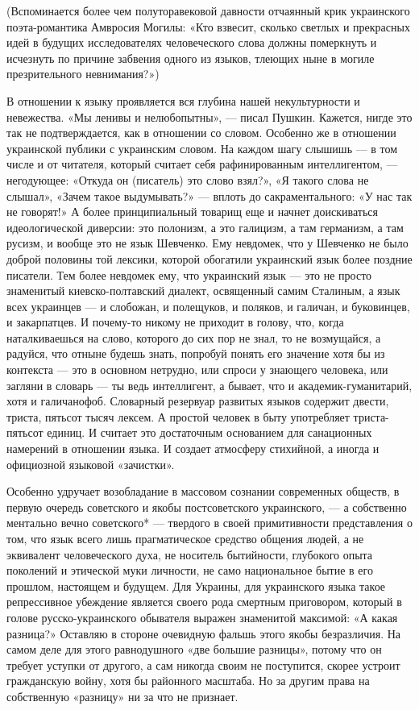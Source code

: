 (Вспоминается более чем полуторавековой давности отчаянный крик украинского
поэта-романтика Амвросия Могилы: «Кто взвесит, сколько светлых и прекрасных
идей в будущих исследователях человеческого слова должны померкнуть и исчезнуть
по причине забвения одного из языков, тлеющих ныне в могиле презрительного
невнимания?»)

В отношении к языку проявляется вся глубина нашей некультурности и невежества.
«Мы ленивы и нелюбопытны», — писал Пушкин. Кажется, нигде это так не
подтверждается, как в отношении со словом. Особенно же в отношении украинской
публики с украинским словом. На каждом шагу слышишь — в том числе и от
читателя, который считает себя рафинированным интеллигентом, —негодующее:
«Откуда он (писатель) это слово взял?», «Я такого слова не слышал», «Зачем
такое выдумывать?» — вплоть до сакраментального: «У нас так не говорят!» А
более принципиальный товарищ еще и начнет доискиваться идеологической диверсии:
это полонизм, а это галицизм, а там германизм, а там русизм, и вообще это не
язык Шевченко. Ему невдомек, что у Шевченко не было доброй половины той
лексики, которой обогатили украинский язык более поздние писатели. Тем более
невдомек ему, что украинский язык — это не просто знаменитый киевско-полтавский
диалект, освященный самим Сталиным, а язык всех украинцев — и слобожан, и
полещуков, и поляков, и галичан, и буковинцев, и закарпатцев. И почему-то
никому не приходит в голову, что, когда наталкиваешься на слово, которого до
сих пор не знал, то не возмущайся, а радуйся, что отныне будешь знать, попробуй
понять его значение хотя бы из контекста — это в основном нетрудно, или спроси
у знающего человека, или загляни в словарь — ты ведь интеллигент, а бывает, что
и академик-гуманитарий, хотя и галичанофоб. Словарный резервуар развитых языков
содержит двести, триста, пятьсот тысяч лексем. А простой человек в быту
употребляет триста-пятьсот единиц. И считает это достаточным основанием для
санационных намерений в отношении языка. И создает атмосферу стихийной, а
иногда и официозной языковой «зачистки».

Особенно удручает возобладание в массовом сознании современных обществ, в
первую очередь советского и якобы постсоветского украинского, — а собственно
ментально вечно советского* — твердого в своей примитивности представления о
том, что язык всего лишь прагматическое средство общения людей, а не эквивалент
человеческого духа, не носитель бытийности, глубокого опыта поколений и
этической муки личности, не само национальное бытие в его прошлом, настоящем и
будущем. Для Украины, для украинского языка такое репрессивное убеждение
является своего рода смертным приговором, который в голове русско-украинского
обывателя выражен знаменитой максимой: «А какая разница?» Оставляю в стороне
очевидную фальшь этого якобы безразличия. На самом деле для этого равнодушного
«две большие разницы», потому что он требует уступки от другого, а сам никогда
своим не поступится, скорее устроит гражданскую войну, хотя бы районного
масштаба. Но за другим права на собственную «разницу» ни за что не признает.


